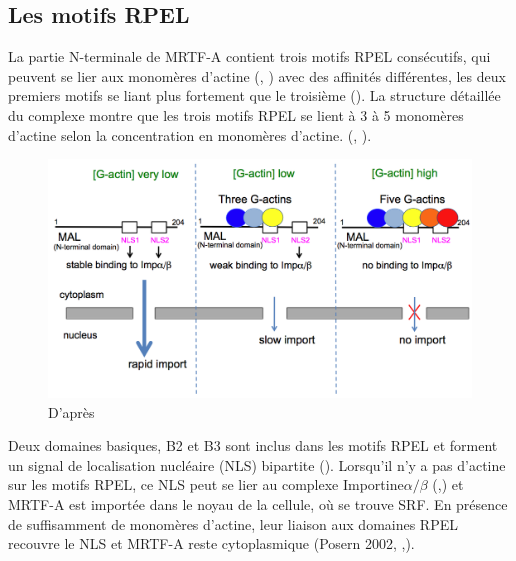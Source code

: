  \subsection{Les motifs RPEL}
 
 La partie N-terminale de MRTF-A contient trois motifs RPEL consécutifs, qui peuvent se lier aux monomères d'actine (\cite{posern_mutant_2004}, \cite{mouilleron_molecular_2008}) avec des affinités différentes, les deux premiers motifs se liant plus fortement que le troisième (\cite{guettler_rpel_2008}). La structure détaillée du complexe montre que les trois motifs RPEL se lient à 3 à 5 monomères d'actine selon la concentration en monomères d'actine. (\cite{hirano_sensing_2011}, \cite{treisman_structure_2011}). 
 
 
 \begin{figure}[h!]
 \includegraphics[scale=0.30]{MRTF-A_actines_complexes.png}
 \caption{D'après \cite{hirano_sensing_2011}\label{hirano}}
 \end{figure}
 Deux domaines basiques, B2 et B3 sont inclus dans les motifs RPEL et forment un signal de localisation nucléaire (NLS) bipartite (\cite{rajakyla_actin-regulated_2010}). Lorsqu'il n'y a pas d'actine sur les motifs RPEL, ce NLS peut se lier au complexe Importine$\alpha / \beta$ (\cite{hirano_sensing_2011},\cite{rajakyla_actin-regulated_2010}) et MRTF-A est importée dans le noyau de la cellule, où se trouve SRF. En présence de suffisamment de monomères d'actine, leur liaison aux domaines RPEL recouvre le NLS et MRTF-A reste cytoplasmique (Posern 2002, \cite{miralles_actin_2003},\cite{posern_mutant_2004}). 
 
